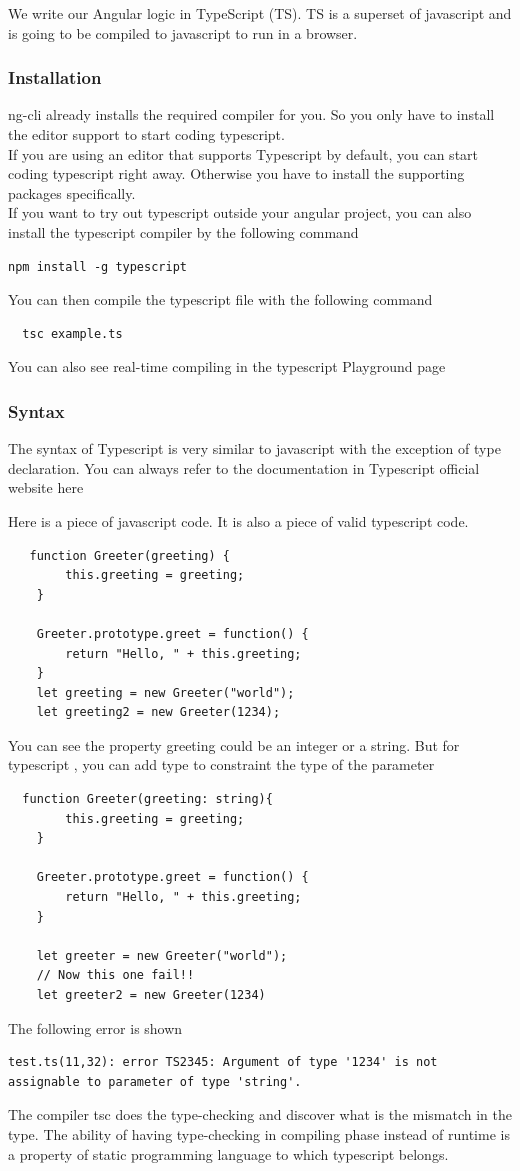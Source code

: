 \documentclass[a4paper]{article}
\begin{document}
We write our Angular logic in TypeScript (TS). TS is a superset of javascript and is going to be compiled to javascript to run in a browser.
\subsubsection{Installation}
ng-cli already installs the required compiler for you. So you only have to install the editor support to start coding typescript.\\

If you are using an editor that supports Typescript by default, you can start coding typescript right away. Otherwise you have to install the supporting packages specifically.\\

If you want to try out typescript outside your angular project, you can also install the typescript compiler by the following command
\begin{lstlisting}
npm install -g typescript
\end{lstlisting}
You can then compile the typescript file with the following command
\begin{lstlisting}
  tsc example.ts
\end{lstlisting}
You can also see real-time compiling in the typescript Playground page

\subsubsection{Syntax}
The syntax of Typescript is very similar to javascript with the exception of type declaration. You can always refer to the documentation in Typescript official website here

Here is a piece of javascript code. It is also a piece of valid typescript code.
\begin{lstlisting}
   function Greeter(greeting) {
        this.greeting = greeting;
    }

    Greeter.prototype.greet = function() {
        return "Hello, " + this.greeting;
    }
    let greeting = new Greeter("world");
    let greeting2 = new Greeter(1234);
\end{lstlisting}
You can see the property greeting could be an integer or a string. But for typescript , you can add type to constraint the type of the parameter
\begin{lstlisting}
  function Greeter(greeting: string){
        this.greeting = greeting;
    }

    Greeter.prototype.greet = function() {
        return "Hello, " + this.greeting;
    }

    let greeter = new Greeter("world");
    // Now this one fail!!
    let greeter2 = new Greeter(1234)
\end{lstlisting}
The following error is shown
\begin{lstlisting}
test.ts(11,32): error TS2345: Argument of type '1234' is not assignable to parameter of type 'string'.
\end{lstlisting}
The compiler tsc does the type-checking and discover what is the mismatch in the type. The ability of having type-checking in compiling phase instead of runtime is a property of static programming language to which typescript belongs.
\end{document}
